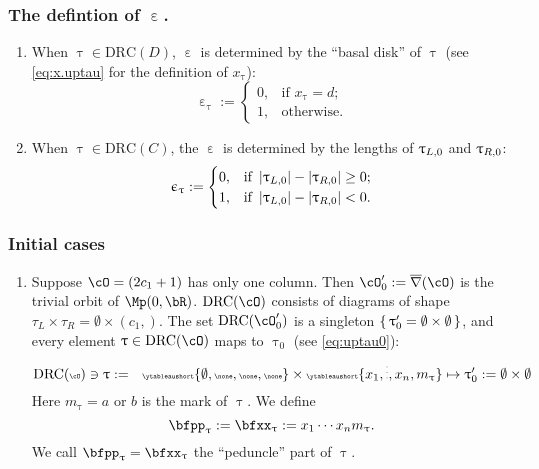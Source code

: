 \documentclass[12pt,a4paper]{amsart}
\def\abs#1{\left|{#1}\right|}
\def\eDD{\overline{\nabla}}
\numberwithin{equation}{section}
\theoremstyle{remark}
\def\drc{\mathrm{DRC}}
\let\ytb=\ytableaushort
\def\cOp{\cO^{\prime}}
\def\uptaup{\uptau^{\prime}}
\begin{document}
\subsubsection{The defintion of $\upepsilon$.} \label{sec:upepsilon}
\begin{enumerate}[label=(\arabic*).,series=alg1]
  \item When $\uptau\in \drc(D)$, $\upepsilon$ is determined by the ``basal
  disk'' of $\uptau$ (see \eqref{eq:x.uptau} for the definition of $x_{\uptau}$):
  \[
    \upepsilon_{\uptau}:=
    \begin{cases}
      0, & \text{if $x_{\uptau}=d$;} \\
      1, & \text{otherwise.}
    \end{cases}
  \]
  \item When $\uptau\in \drc(C)$, the  $\upepsilon$  is determined by
  the lengths of $\uptau_{L,0}$ and $\uptau_{R,0}$:
  \[
    \upepsilon_{\uptau} :=
    \begin{cases}
      0, & \text{if }\abs{\taulf} - \abs{\taurf} \geq  0;\\
      1, & \text{if }\abs{\taulf} - \abs{\taurf}<0.
    \end{cases}
  \]
\end{enumerate}


\subsubsection{Initial cases}

\begin{enumerate}[resume*=alg1]
  \item Suppose $\cO = (2c_{1}+1)$ has only one column. Then
        $\cOp_{0}:=\eDD(\cO)$ is the trivial orbit of $\Mp(0,\bR)$. $\drc(\cO)$
        consists of diagrams of shape
        $\tau_{L}\times \tau_{R} =\emptyset\times (c_{1},)$.
        The set $\drc(\cOp_{0})$ is a singleton $\set{\uptaup_{0}=\emptyset\times \emptyset}$, and every element
        $\uptau \in \drc(\cO)$ maps to $\uptau_{0}$ (see \eqref{eq:uptau0}):
        \[\tiny
          \drc(\cO)\ni \uptau:= \hspace{1em} \ytb{\emptyset,\none,\none,\none}
          \times \ytb{{x_{1}},\vdots,{x_{n}},{m_{\uptau}}}
          \mapsto \uptaup_{0}:=\emptyset\times \emptyset
        \]
        Here $m_{\uptau}=a$ or $b$ is the mark of $\uptau$.
        We define
        \[
          \bfpp_{\uptau}:=\bfxx_{\uptau} := x_{1}\cdots x_{n} m_{\uptau}.%
        \]
        We call $\bfpp_{\uptau}=\bfxx_{\uptau}$ the ``peduncle'' part of
        $\uptau$.
\end{enumerate}
\end{document}
